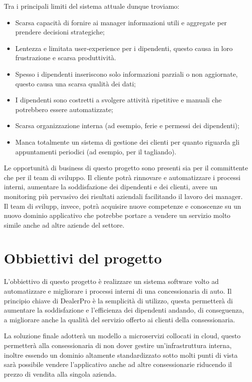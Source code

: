 \documentclass{article}
\begin{document}
  Tra i principali limiti del sistema attuale dunque troviamo:
  \begin{itemize}
    \item Scarsa capacità di fornire ai manager informazioni utili e aggregate per prendere decisioni strategiche;
    \item Lentezza e limitata user-experience per i dipendenti, questo causa in loro frustrazione e scarsa produttività. 
    \item Spesso i dipendenti inseriscono solo informazioni parziali o non aggiornate, questo causa una scarsa qualità dei dati;
    \item I dipendenti sono costretti a svolgere attività ripetitive e manuali che potrebbero essere automatizzate;
    \item Scarsa organizzazione interna (ad esempio, ferie e permessi dei dipendenti);
    \item Manca totalmente un sistema di gestione dei clienti per quanto riguarda gli appuntamenti periodici 
    (ad esempio, per il tagliando).
  \end{itemize}

  Le opportunità di business di questo progetto sono presenti sia per il committente che per il team di sviluppo. Il cliente potrà
    rinnovare e automatizzare i processi interni, aumentare la soddisfazione dei dipendenti e dei clienti, avere un
    monitoring più pervasivo dei risultati aziendali facilitando il lavoro dei manager. 
    Il team di svilupp, invece, potrà acquisire nuove competenze e conoscenze su un nuovo dominio applicativo che potrebbe portare a vendere
    un servizio molto simile anche ad altre aziende del settore.


  \section*{Obbiettivi del progetto}

  L'obbiettivo di questo progetto è realizzare un sistema software volto ad automatizzare e migliorare 
    i processi interni di una concessionaria di auto.
    Il principio chiave di DealerPro è la semplicità di utilizzo, questa permetterà di aumentare la 
    soddisfazione e l'efficienza dei dipendenti andando, di conseguenza, a migliorare anche la qualità
    del servizio offerto ai clienti della consessionaria.

  La soluzione finale adotterà un modello a microservizi collocati in cloud, questo permetterà alla
    consessionaria di non dover gestire un'infrastruttura interna, inoltre essendo un dominio altamente
    standardizzato sotto molti punti di vista sarà possibile vendere l'applicativo anche ad altre 
    consessionarie riducendo il prezzo di vendita alla singola azienda.
 
\end{document}
